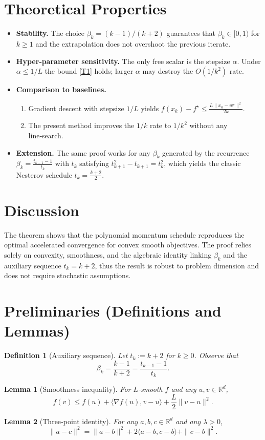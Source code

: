 \documentclass{article}
\newtheorem{lemma}{Lemma}
\newtheorem{definition}{Definition}
\newcommand{\grad}{\nabla}
\newcommand{\R}{\mathbb{R}}
\begin{document}
\section*{Theoretical Properties}
\begin{itemize}[leftmargin=*]
\item \textbf{Stability.} The choice $\beta_k=(k-1)/(k+2)$ guarantees that $\beta_k\in[0,1)$ for $k\ge1$ and the extrapolation does not overshoot the previous iterate.
\item \textbf{Hyper‑parameter sensitivity.} The only free scalar is the stepsize $\alpha$. Under $\alpha\le 1/L$ the bound \eqref{T1} holds; larger $\alpha$ may destroy the $O(1/k^2)$ rate.
\item \textbf{Comparison to baselines.}
    \begin{enumerate}
        \item Gradient descent with stepsize $1/L$ yields $f(x_k)-f^\star\le \frac{L\|x_0-w^\star\|^2}{2k}$.
        \item The present method improves the $1/k$ rate to $1/k^2$ without any line‑search.
    \end{enumerate}
\item \textbf{Extension.} The same proof works for any $\beta_k$ generated by the recurrence
        $\beta_k=\frac{t_{k-1}-1}{t_k}$ with $t_k$ satisfying $t_{k+1}^2-t_{k+1}=t_k^2$, which yields the classic Nesterov schedule $t_k=\frac{k+2}{2}$.
\end{itemize}

\section*{Discussion}
The theorem shows that the polynomial momentum schedule reproduces the optimal accelerated convergence for convex smooth objectives. The proof relies solely on convexity, smoothness, and the algebraic identity linking $\beta_k$ and the auxiliary sequence $t_k=k+2$, thus the result is robust to problem dimension and does not require stochastic assumptions.

\section*{Preliminaries (Definitions and Lemmas)}
\begin{definition}[Auxiliary sequence]\label{def:tk}
Let $t_k:=k+2$ for $k\ge0$. Observe that
\[
\beta_k=\frac{k-1}{k+2}= \frac{t_{k-1}-1}{t_k}.
\tag{D1}
\]
\end{definition}
\begin{lemma}[Smoothness inequality]\label{lem:smooth}
For $L$‑smooth $f$ and any $u,v\in\R^d$,
\[
f(v)\le f(u)+\langle\grad f(u),v-u\rangle+\frac{L}{2}\|v-u\|^2 .
\tag{L1}
\]
\end{lemma}
\begin{lemma}[Three‑point identity]\label{lem:three}
For any $a,b,c\in\R^d$ and any $\lambda>0$,
\[
\|a-c\|^2 = \|a-b\|^2 + 2\langle a-b,c-b\rangle + \|c-b\|^2 .
\tag{L2}
\]
\end{lemma}
\end{document}
